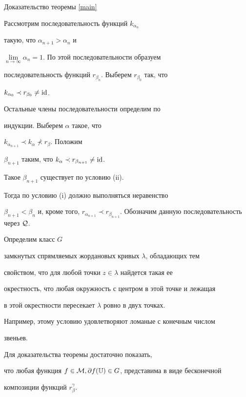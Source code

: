 \begin{pf*}{Доказательство теоремы \ref{main}}


Рассмотрим последовательность функций $k_{\alpha_n}$


такую, что $\alpha_{n+1}>\alpha_n$ и


$\lim\limits_{n\to\infty}\alpha_n=1$. По этой последовательности образуем


последовательность функций $r_{\beta_n}$. Выберем $r_{\beta_0}$ так, что


$k_{\alpha_0}\prec r_{\beta_0}\neq\operatorname{id}$.


Остальные члены последовательности определим по


индукции. Выберем $\alpha$ такое, что


$k_{\alpha_{n+1}}\prec k_\alpha\not\prec r_{\beta}$. Положим


$\beta_{n+1}$ таким, что $k_{\alpha}\prec r_{\beta_{n+1}}\neq\operatorname{id}$.


Такое $\beta_{n+1}$ существует по условию (ii).


Тогда по условию (i) должно выполняться неравенство


$\beta_{n+1}<\beta_n$ и, кроме того, $r_{\alpha_{n+1}}\prec


r_{\beta_{n+1}}$. Обозначим данную последовательность через $\cal Q$.





Определим класс $G$


замкнутых спрямляемых жордановых кривых $\lambda$, обладающих тем


свойством, что для любой точки $z\in\lambda$ найдется такая ее


окрестность, что любая окружность с центром в этой точке и лежащая


в этой окрестности пересекает $\lambda$ ровно в двух точках.


Например, этому условию удовлетворяют ломаные с конечным числом


звеньев.





Для доказательства теоремы достаточно показать, 


что любая функция $f\in {\cal M},\partial


f(\Bbb{ U})\in G$, представима в виде бесконечной 


композиции функций $r_\beta^\gamma$.









\end{pf*}
